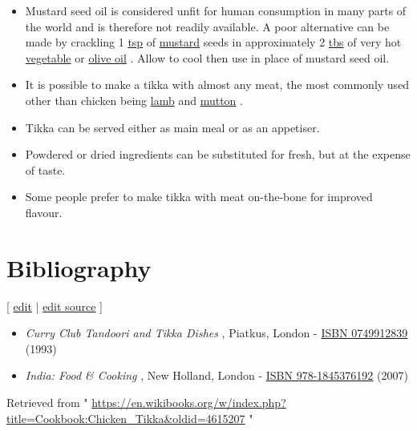 \documentclass[11pt,a4paper]{article}
\begin{document}
\begin{itemize}
\item Mustard seed oil is considered unfit for human consumption in many parts of the world and is therefore not readily available. A poor alternative can be made by crackling 1 \href{https://en.wikibooks.org/wiki/Cookbook:Teaspoon}{tsp} of \href{https://en.wikibooks.org/wiki/Cookbook:Mustard}{mustard} seeds in approximately 2 \href{https://en.wikibooks.org/wiki/Cookbook:Tablespoon}{tbs} of very hot \href{https://en.wikibooks.org/wiki/Cookbook:Vegetable\_Oil}{vegetable} or \href{https://en.wikibooks.org/wiki/Cookbook:Olive\_Oil}{olive oil} . Allow to cool then use in place of mustard seed oil.
\item It is possible to make a tikka with almost any meat, the most commonly used other than chicken being \href{https://en.wikibooks.org/wiki/Cookbook:Lamb}{lamb} and \href{https://en.wikibooks.org/wiki/Cookbook:Mutton}{mutton} .
\item Tikka can be served either as main meal or as an appetiser.
\item Powdered or dried ingredients can be substituted for fresh, but at the expense of taste.
\item Some people prefer to make tikka with meat on-the-bone for improved flavour.
\end{itemize}

\section{Bibliography}

[ \href{https://en.wikibooks.org/w/index.php?title=Cookbook:Chicken\_Tikka\&veaction=edit\&section=4}{edit} | \href{https://en.wikibooks.org/w/index.php?title=Cookbook:Chicken\_Tikka\&action=edit\&section=4}{edit source} ]

\begin{itemize}
\item \textit{Curry Club Tandoori and Tikka Dishes} , Piatkus, London - \href{https://en.wikibooks.org/wiki/Special:BookSources/0749912839}{ISBN 0749912839} (1993)
\item \textit{India: Food \& Cooking} , New Holland, London - \href{https://en.wikibooks.org/wiki/Special:BookSources/978-1845376192}{ISBN 978-1845376192} (2007)
\end{itemize}

Retrieved from " \href{https://en.wikibooks.org/w/index.php?title=Cookbook:Chicken\_Tikka\&oldid=4615207}{https://en.wikibooks.org/w/index.php?title=Cookbook:Chicken\_Tikka\&oldid=4615207} "
\end{document}
